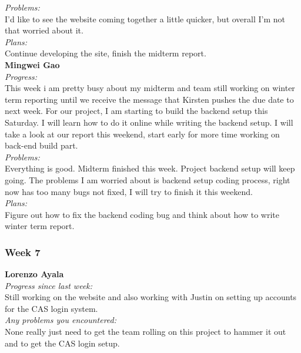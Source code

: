 \noindent\textit{Problems:}\\
\noindent I'd like to see the website coming together a little quicker, but overall I'm not that worried about it.\\

\noindent\textit{Plans:}\\
\noindent Continue developing the site, finish the midterm report.\\

\noindent\textbf{Mingwei Gao}\\
\noindent\textit{Progress:}\\
This week i am pretty busy about my midterm and team still working on winter term reporting until we receive the message that Kirsten pushes the due date to next week. For our project, I am starting to build the backend setup this Saturday. I will learn how to do it online while writing the backend setup. I will take a look at our report this weekend, start early for more time working on back-end build part.\\

\noindent\textit{Problems:}\\
\noindent  Everything is good. Midterm finished this week. Project backend setup will keep going. The problems I am worried about is backend setup coding process, right now has too many bugs not fixed, I will try to finish it this weekend.\\

\noindent\textit{Plans:}\\
\noindent Figure out how to fix the backend coding bug and think about how to write winter term report.\\

\subsubsection{Week 7}

\textbf{Lorenzo Ayala}\\
\noindent\textit{Progress since last week:}\\
Still working on the website and also working with Justin on setting up accounts for the CAS login system. \\

\noindent\textit{Any problems you encountered:}\\
\noindent  None really just need to get the team rolling on this project to hammer it out and to get the CAS login setup.\\

